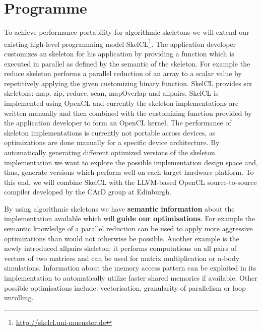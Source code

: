 \documentclass[11pt,a4paper]{article}
\begin{document}
\section{Programme}
To achieve performance portability for algorithmic skeletons we will extend our existing high-level programming model SkelCL\footnote{\url{http://skelcl.uni-muenster.de}}.
The application developer customizes an skeleton for his application by providing a function which is executed in parallel as defined by the semantic of the skeleton.
For example the reduce skeleton performs a parallel reduction of an array to a scalar value by repetitively applying the given customizing binary function.
SkelCL provides six skeletons: map, zip, reduce, scan, mapOverlap and allpairs.
SkelCL is implemented using OpenCL and currently the skeleton implementations are written manually and then combined with the customizing function provided by the application developer to form an OpenCL kernel.
The performance of skeleton implementations is currently not portable across devices, as optimizations are done manually for a specific device architecture.
By automatically generating different optimized versions of the skeleton implementation we want to explore the possible implementation design space and, thus, generate versions which perform well on each target hardware platform.
To this end, we will combine SkelCL with the LLVM-based OpenCL source-to-source compiler developed by the CArD group at Edinburgh.

By using algorithmic skeletons we have \textbf{semantic information} about the implementation available which will \textbf{guide our optimisations}.
For example the semantic knowledge of a parallel reduction can be used to apply more aggressive optimizations than would not otherwise be possible.
Another example is the newly introduced allpairs skeleton:
it performs computations on all pairs of vectors of two matrices and can be used for matrix multiplication or n-body simulations.
Information about the memory access pattern can be exploited in its implementation to automatically utilize faster shared memories if available.
Other possible optimisations include: vectorisation, granularity of parallelism or loop unrolling.
\end{document}
